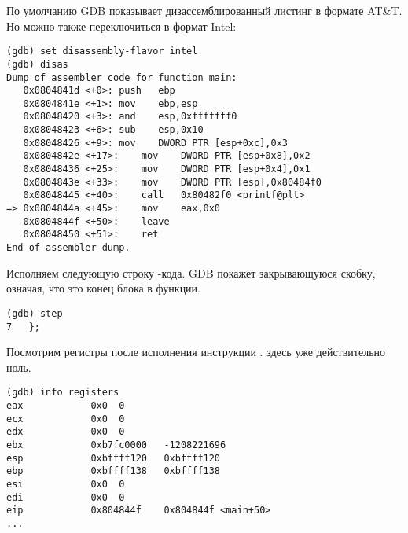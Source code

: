 По умолчанию \ac{GDB} показывает дизассемблированный листинг в формате AT\&T.
Но можно также переключиться в формат Intel:

\begin{lstlisting}[style=customasmx86]
(gdb) set disassembly-flavor intel
(gdb) disas
Dump of assembler code for function main:
   0x0804841d <+0>:	push   ebp
   0x0804841e <+1>:	mov    ebp,esp
   0x08048420 <+3>:	and    esp,0xfffffff0
   0x08048423 <+6>:	sub    esp,0x10
   0x08048426 <+9>:	mov    DWORD PTR [esp+0xc],0x3
   0x0804842e <+17>:	mov    DWORD PTR [esp+0x8],0x2
   0x08048436 <+25>:	mov    DWORD PTR [esp+0x4],0x1
   0x0804843e <+33>:	mov    DWORD PTR [esp],0x80484f0
   0x08048445 <+40>:	call   0x80482f0 <printf@plt>
=> 0x0804844a <+45>:	mov    eax,0x0
   0x0804844f <+50>:	leave  
   0x08048450 <+51>:	ret    
End of assembler dump.
\end{lstlisting}

Исполняем следующую строку \CCpp{}-кода.
\ac{GDB} покажет закрывающуюся скобку, означая, что это конец блока в функции.

\begin{lstlisting}
(gdb) step
7	};
\end{lstlisting}

Посмотрим регистры после исполнения инструкции .
\EAX здесь уже действительно ноль.

\begin{lstlisting}
(gdb) info registers
eax            0x0	0
ecx            0x0	0
edx            0x0	0
ebx            0xb7fc0000	-1208221696
esp            0xbffff120	0xbffff120
ebp            0xbffff138	0xbffff138
esi            0x0	0
edi            0x0	0
eip            0x804844f	0x804844f <main+50>
...
\end{lstlisting}

